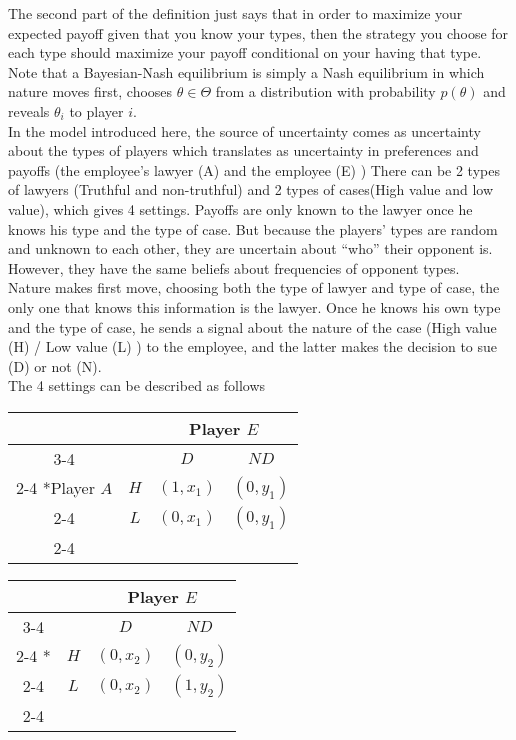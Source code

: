 The second part of the definition just says that in order to maximize your expected payoff given that you know your types, then the strategy you choose for each type should maximize your payoff conditional on your having that type. Note that a Bayesian-Nash equilibrium is simply a Nash equilibrium in which nature moves first, chooses $\theta\in \Theta$ from a distribution with probability $p(\theta)$ and reveals $\theta_i$ to player $i$.\\

In the model introduced here, the source of uncertainty comes  as uncertainty about the types of players which translates as uncertainty in preferences and payoffs (the employee's lawyer (A)  and the employee (E) ) There can be 2 types of lawyers (Truthful and non-truthful) and 2 types of cases(High value and low value), which gives 4 settings. Payoffs are only known to the lawyer once he knows his type and the type of case. But because the players’ types are random and unknown to each other, they are uncertain about “who” their opponent is. However, they have the same beliefs about frequencies of opponent types.\\

Nature makes first move, choosing both the type of lawyer and type of case, the only one that knows this information is the lawyer. Once he knows his own type and the type of case, he sends a signal about the nature of the case (High value (H) / Low value (L) ) to the employee, and the latter makes the decision to sue (D) or not (N). \\

The 4 settings can be described as follows 

  \begin{table}[H]
  \begin{center}
    \setlength{\extrarowheight}{2pt}
    \begin{tabular}{*{4}{c|}}
      \multicolumn{2}{c}{} & \multicolumn{2}{c}{Player $E$}\\\cline{3-4}
      \multicolumn{1}{c}{} &  & $D$  & $ND$ \\\cline{2-4}
      \multirow{2}*{Player $A$}  & $H$ & $(1,x_1)$ & $(0,y_1)$ \\\cline{2-4}
      & $L$ & $(0,x_1)$ & $(0,y_1)$ \\\cline{2-4}
    \end{tabular}
            \begin{tabular}{*{4}{c|}}
      \multicolumn{2}{c}{} & \multicolumn{2}{c}{Player $E$}\\\cline{3-4}
      \multicolumn{1}{c}{} &  & $D$  & $ND$ \\\cline{2-4}
      \multirow{2}*{}  & $H$ & $(0,x_2)$ & $(0,y_2)$ \\\cline{2-4}
      & $L$ & $(0,x_2)$ & $(1,y_2)$ \\\cline{2-4}
    \end{tabular}
    \end{center}
  \end{table}
  
